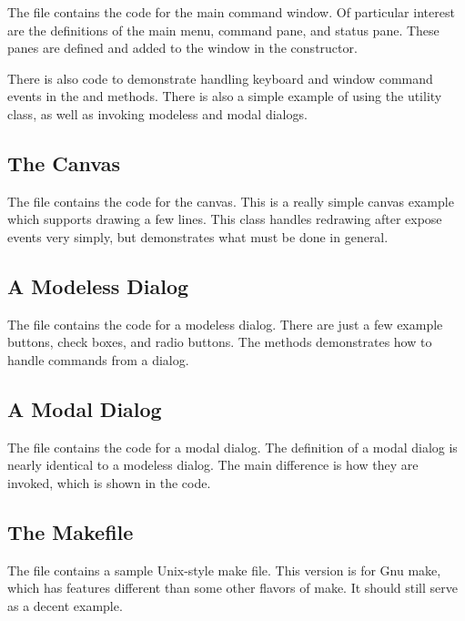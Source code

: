 The file  contains the code for the main
command window. Of particular interest are the definitions of
the main menu, command pane, and status pane. These panes are
defined and added to the window in the constructor.

There is also code to demonstrate handling keyboard and window
command events in the  and  methods.
There is also a simple example of using the 
utility class, as well as invoking modeless and modal dialogs.

\subsection*{The Canvas}

The file  contains the code for the canvas.
This is a really simple canvas example which supports
drawing a few lines. This class handles redrawing after
expose events very simply, but demonstrates what must be done
in general.


\subsection*{A Modeless Dialog}

The file  contains the code for a modeless
dialog. There are just a few example buttons, check boxes, and
radio buttons. The  methods demonstrates how
to handle commands from a dialog.


\subsection*{A Modal Dialog}

The file  contains the code for a modal dialog.
The definition of a modal dialog is nearly identical to a modeless
dialog. The main difference is how they are invoked, which is
shown in the  code.


\subsection*{The Makefile}

The file  contains a sample Unix-style make file.
This version is for Gnu make, which has features different
than some other flavors of make. It should still serve as a
decent example.
